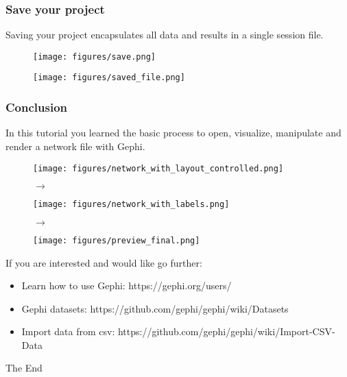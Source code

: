 \documentclass[10pt]{beamer}
\begin{document}
\begin{frame}
\frametitle{Save your project}
Saving your project encapsulates all data and results in a single session file.
\begin{figure}
\centering
\begin{minipage}{.45\textwidth}
\centering
\texttt{[image: figures/save.png]}
\end{minipage}
\begin{minipage}{.45\textwidth}
\centering
\texttt{[image: figures/saved\_file.png]}
\end{minipage}
\end{figure}
\end{frame}

\begin{frame}
\frametitle{Conclusion}
In this tutorial you learned the basic process to open, visualize, manipulate and render
a network file with Gephi.
\begin{figure}
\centering
\begin{minipage}{.3\textwidth}
\centering
\texttt{[image: figures/network\_with\_layout\_controlled.png]}
\end{minipage}
$\rightarrow$
\begin{minipage}{.3\textwidth}
\centering
\texttt{[image: figures/network\_with\_labels.png]}
\end{minipage}
$\rightarrow$
\begin{minipage}{.3\textwidth}
\centering
\texttt{[image: figures/preview\_final.png]}
\end{minipage}
\end{figure}

If you are interested and would like go further:
\begin{itemize}
	\item Learn how to use Gephi: https://gephi.org/users/
	\item Gephi datasets: https://github.com/gephi/gephi/wiki/Datasets
	\item Import data from csv: https://github.com/gephi/gephi/wiki/Import-CSV-Data
\end{itemize}
\end{frame}

\begin{frame}
\Huge{\centerline{The End}}
\end{frame}

\end{document}
